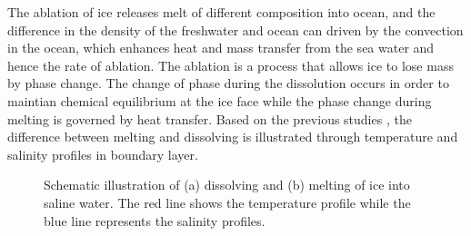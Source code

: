 \documentclass[11pt,a4paper]{article}
\begin{document}
	
	The ablation of ice releases melt of different composition into ocean, and the difference in the density of the freshwater and ocean can driven by the convection in the ocean, which enhances heat and mass transfer from the sea water and hence the rate of ablation. The ablation is a process that allows ice to lose mass by phase change. The change of phase during the dissolution occurs in order to maintian chemical equilibrium at the ice face while the phase change during melting is governed by heat transfer. Based on the previous studies \citep{wells2011melting, kerr2015dissolution}, the difference between melting and dissolving is illustrated through temperature and salinity profiles in boundary layer.
	
	\begin{figure}[H]
		
		\centering
		\label{fig:4a}
		\label{fig:4b}
		
		\label{fig:4}
		
		\caption{Schematic illustration of (a) dissolving and (b) melting of ice into saline water. The red line shows the temperature profile while the blue line represents the salinity profiles.}
	\end{figure}
	
\end{document}
